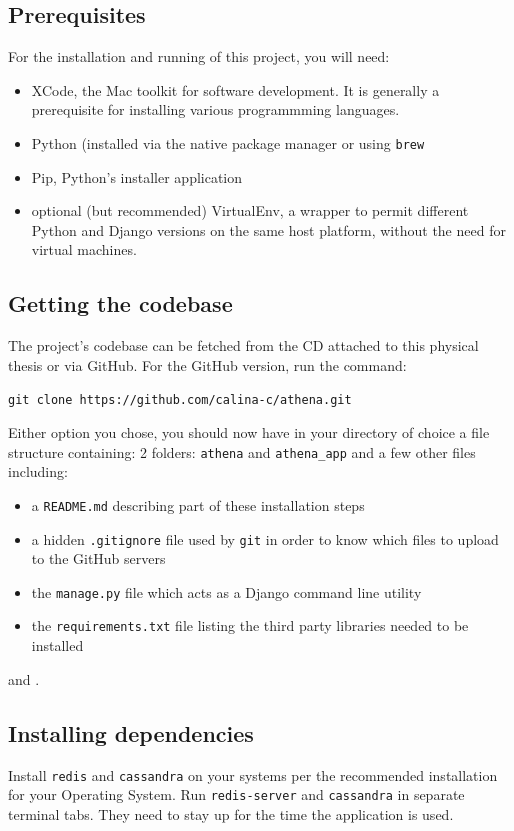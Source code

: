 \documentclass[12pt,a4paper,twoside]{report}
\begin{document}
\subsection*{Prerequisites}
For the installation and running of this project, you will need:

\begin{itemize}
\item XCode, the Mac toolkit for software development. It is generally a prerequisite for installing various programmming languages.
\item Python (installed via the native package manager or using \texttt{brew}
\item Pip, Python's installer application
\item optional (but recommended) VirtualEnv, a wrapper to permit different Python and Django versions on the same host platform, without the need for virtual machines.
\end{itemize}

\subsection*{Getting the codebase}
The project's codebase can be fetched from the CD attached to this physical thesis or via GitHub. For the GitHub version, run the command:

\texttt{git clone https://github.com/calina-c/athena.git}

Either option you chose, you should now have in your directory of choice a file structure containing: 2 folders: \texttt{athena} and \texttt{athena\_app} and a few other files including:

\begin{itemize}
\item a \texttt{README.md} describing part of these installation steps
\item a hidden \texttt{.gitignore} file used by \texttt{git} in order to know which files to upload to the GitHub servers
\item  the \texttt{manage.py} file which acts as a Django command line utility
\item the \texttt{requirements.txt} file listing the third party libraries needed to be installed
\end{itemize}  and .

\subsection*{Installing dependencies}
Install \texttt{redis} and \texttt{cassandra} on your systems per the recommended installation for your Operating System. Run \texttt{redis-server} and \texttt{cassandra} in separate terminal tabs. They need to stay up for the time the application is used.
\end{document}
